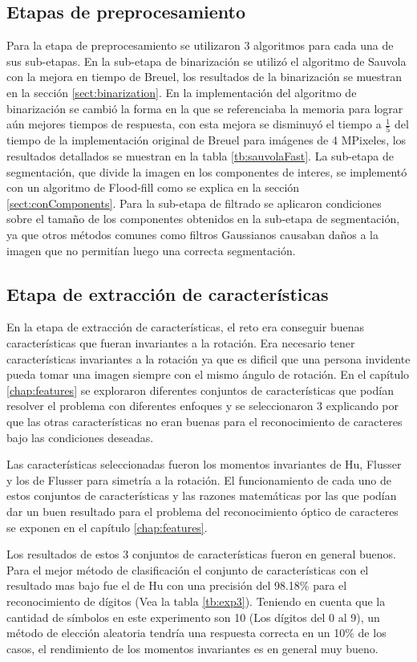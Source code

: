 \documentclass[a4paper, 11pt, oneside]{report}
\begin{document}
\subsection{Etapas de preprocesamiento}
Para la etapa de preprocesamiento se utilizaron 3 algoritmos para cada una de sus sub-etapas. En la sub-etapa de binarización se utilizó el algoritmo de Sauvola con la mejora en tiempo de Breuel, los resultados de la binarización se muestran en la sección \ref{sect:binarization}. En la implementación del algoritmo de binarización se cambió la forma en la que se referenciaba la memoria para lograr aún mejores tiempos de respuesta, con esta mejora se disminuyó el tiempo a $\frac{1}{5}$ del tiempo de la implementación original de Breuel para imágenes de 4 MPixeles, los resultados detallados se muestran en la tabla \ref{tb:sauvolaFast}. La sub-etapa de segmentación, que divide la imagen en los componentes de interes, se implementó con un algoritmo de Flood-fill como se explica en la sección \ref{sect:conComponents}. Para la sub-etapa de filtrado se aplicaron condiciones sobre el tamaño de los componentes obtenidos en la sub-etapa de segmentación, ya que otros métodos comunes como filtros Gaussianos causaban daños a la imagen que no permitían luego una correcta segmentación.

\subsection{Etapa de extracción de características}
En la etapa de extracción de características, el reto era conseguir buenas características que fueran invariantes a la rotación. Era necesario tener características invariantes a la rotación ya que es dificil que una persona invidente pueda tomar una imagen siempre con el mismo ángulo de rotación. En el capítulo \ref{chap:features} se exploraron diferentes conjuntos de características que podían resolver el problema con diferentes enfoques y se seleccionaron 3 explicando por que las otras características no eran buenas para el reconocimiento de caracteres bajo las condiciones deseadas. 

Las características seleccionadas fueron los momentos invariantes de Hu, Flusser y los de Flusser para simetría a la rotación. El funcionamiento de cada uno de estos conjuntos de características y las razones matemáticas por las que podían dar un buen resultado para el problema del reconocimiento óptico de caracteres se exponen en el capítulo \ref{chap:features}.

Los resultados de estos 3 conjuntos de características fueron en general buenos. Para el mejor método de clasificación el conjunto de características con el resultado mas bajo fue el de Hu con una precisión del 98.18\% para el reconocimiento de dígitos (Vea la tabla \ref{tb:exp3}). Teniendo en cuenta que la cantidad de símbolos en este experimento son 10 (Los dígitos del 0 al 9), un método de elección aleatoria tendría una respuesta correcta en un 10\% de los casos, el rendimiento de los momentos invariantes es en general muy bueno.
\end{document}
